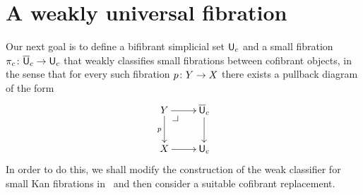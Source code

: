 \documentclass[reqno,10pt,a4paper,oneside,draft]{amsart}
\begin{document}




\newpage

\section{A weakly universal fibration}

Our next goal is to define a bifibrant simplicial set $\mathsf{U}_c$ and a small fibration $\pi_c \colon \overline{\mathsf{U}}_c \to \mathsf{U}_c$ that weakly classifies small fibrations between cofibrant objects, in the sense that for every such fibration $p \colon Y \to X$ there exists a pullback diagram of the form
\[
\xymatrix{
Y \ar[r] \ar[d]_p \drpullback  & \UU_c \ar[d] \\
X \ar[r] &  \U_c }
\]
In order to do this, we shall modify  the construction of the weak classifier for small Kan fibrations 
in~\cite{voevodsky-simplicial-model} and then consider a suitable cofibrant replacement. 

\medskip
\end{document}
